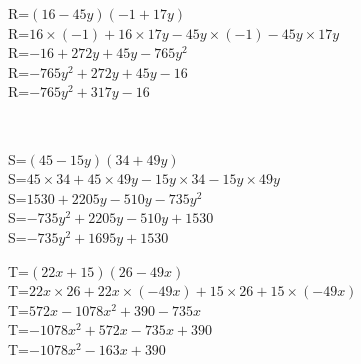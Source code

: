 \documentclass{article}%
\begin{document}
\begin{minipage}{0.5\textwidth}%
R=$(16-45y)(-1+17y)$\\%
R=$16 \times (-1)+16 \times 17y-45y \times (-1)-45y \times 17y$\\%
R=$-16+272y+45y-765y^2$\\%
R=$-765y^2+272y+45y-16$\\%
R=$-765y^2+317y-16$\\%
\end{minipage}%
\\%
\begin{minipage}{0.5\textwidth}%
S=$(45-15y)(34+49y)$\\%
S=$45 \times 34+45 \times 49y-15y \times 34-15y \times 49y$\\%
S=$1530+2205y-510y-735y^2$\\%
S=$-735y^2+2205y-510y+1530$\\%
S=$-735y^2+1695y+1530$\\%
\end{minipage}%
\begin{minipage}{0.5\textwidth}%
T=$(22x+15)(26-49x)$\\%
T=$22x \times 26+22x \times (-49x)+15 \times 26+15 \times (-49x)$\\%
T=$572x-1078x^2+390-735x$\\%
T=$-1078x^2+572x-735x+390$\\%
T=$-1078x^2-163x+390$\\%
\end{minipage}%
\\

%
\end{document}
